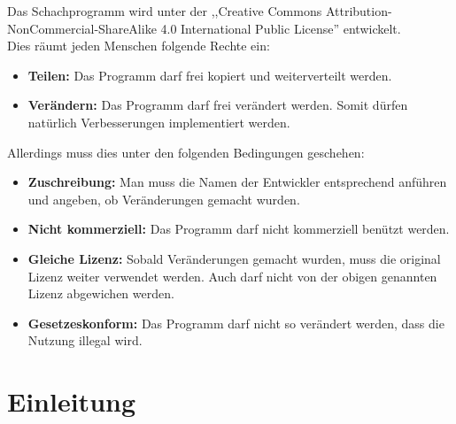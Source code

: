 \documentclass[12pt,a4paper]{article}
\begin{document}
{Das Schachprogramm wird unter der ,,Creative Commons Attribution-NonCommercial-ShareAlike 4.0 International Public License'' entwickelt. \\
Dies räumt jeden Menschen folgende Rechte ein: 
\begin{itemize}
	\item{\textbf{Teilen:} Das Programm darf frei kopiert und weiterverteilt werden.}
	\item{\textbf{Verändern:} Das Programm darf frei verändert werden. Somit dürfen natürlich Verbesserungen implementiert werden.}
\end{itemize}

Allerdings muss dies unter den folgenden Bedingungen geschehen:
\begin{itemize}
	\item{\textbf{Zuschreibung:} Man muss die Namen der Entwickler entsprechend anführen und angeben, ob Veränderungen gemacht wurden.}
	\item{\textbf{Nicht kommerziell:} Das Programm darf nicht kommerziell benützt werden.}
	\item{\textbf{Gleiche Lizenz:} Sobald Veränderungen gemacht wurden, muss die original Lizenz weiter verwendet werden. Auch darf nicht von der obigen genannten Lizenz abgewichen werden.}
	\item{\textbf{Gesetzeskonform:} Das Programm darf nicht so verändert werden, dass die Nutzung illegal wird.}
\end{itemize}





\clearpage\vfill\newpage{}
\setcounter{section}{0}
\section{\sc Einleitung}

}
\end{document}
